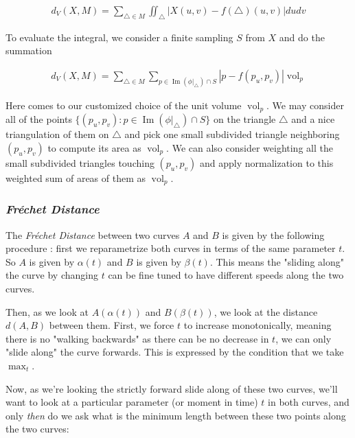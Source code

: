 \begin{align*}
   d_V(X,M)=\sum_{\triangle \in M}\iint_\triangle |X(u,v)-f(\triangle) (u,v)|dudv 
\end{align*}

To evaluate the integral, we consider a finite sampling $S$ from $X$ and do the summation

\begin{align*}
    d_V(X,M)=\sum_{\triangle \in M}\sum_{p\in \operatorname{Im}(\phi|_\triangle)\cap S} |p-f(p_u,p_v)|\operatorname{vol}_p
\end{align*}

Here comes to our customized choice of the unit volume $\operatorname{vol}_p$. We may consider all of the points $\{(p_u,p_v):p\in \operatorname{Im}(\phi|_\triangle)\cap S\}$ on the triangle $\triangle$ and a nice triangulation of them on $\triangle$ and pick one small subdivided triangle neighboring $(p_u,p_v)$ to compute its area as $\operatorname{vol}_p$. We can also consider weighting all the small subdivided triangles touching $(p_u,p_v)$ and apply normalization to this weighted sum of areas of them as $\operatorname{vol}_p$.

\subsubsection{\emph{Fréchet Distance}}

The \emph{Fréchet Distance} between two curves $A$ and $B$ is given by the following
procedure \cite{frechet1}: first we reparametrize both curves in terms of the same parameter
$t$. So $A$ is given by $\alpha(t)$ and $B$ is given by $\beta(t)$. This means the
"sliding along" the curve by changing $t$ can be fine tuned to have different
speeds along the two curves.

\spa

Then, as we look at $A(\alpha(t))$ and $B(\beta(t))$, we look at the distance
$d(A,B)$ between them. First, we force $t$ to increase monotonically, meaning
there is no "walking backwards" as there can be no decrease in $t$, we can only
"slide along" the curve forwards. This is expressed by the condition that
we take $\max_t$.

\spa

Now, as we're looking the strictly forward slide along of these two curves,
we'll want to look at a particular parameter (or moment in time) $t$ 
in both curves, and only \emph{then} do we ask what is the minimum length
between these two points along the two curves:

